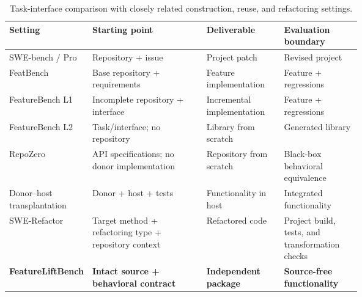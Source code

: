 \begin{table}[tbp]
  \caption{Task-interface comparison with closely related construction, reuse,
  and refactoring settings.}
  \label{tab:task-comparison}
  \centering
  \small
  \setlength{\tabcolsep}{4.2pt}
  \renewcommand{\arraystretch}{1.12}
  \begin{tabularx}{\linewidth}{
    @{}
    >{\raggedright\arraybackslash}p{0.23\linewidth}
    >{\centering\arraybackslash}X
    >{\centering\arraybackslash}p{0.22\linewidth}
    >{\centering\arraybackslash}p{0.22\linewidth}
    @{}
  }
    \toprule
    \textbf{Setting} & \textbf{Starting point} & \textbf{Deliverable} & \textbf{Evaluation boundary} \\
    \midrule
    SWE-bench / Pro
      & Repository + issue
      & Project patch
      & Revised project \\
    FeatBench
      & Base repository + requirements
      & Feature implementation
      & Feature + regressions \\
    FeatureBench L1
      & Incomplete repository + interface
      & Incremental implementation
      & Feature + regressions \\
    FeatureBench L2
      & Task/interface; no repository
      & Library from scratch
      & Generated library \\
    RepoZero
      & API specifications; no donor implementation
      & Repository from scratch
      & Black-box behavioral equivalence \\
    Donor--host transplantation
      & Donor + host + tests
      & Functionality in host
      & Integrated functionality \\
    SWE-Refactor
      & Target method + refactoring type + repository context
      & Refactored code
      & Project build, tests, and transformation checks \\
    \midrule
    \textbf{FeatureLiftBench}
      & \textbf{Intact source + behavioral contract}
      & \textbf{Independent package}
      & \textbf{Source-free functionality} \\
    \bottomrule
  \end{tabularx}
\end{table}
